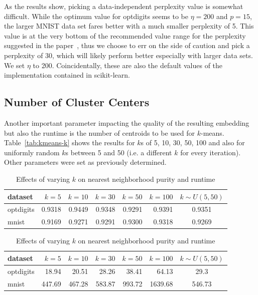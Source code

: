 As the results show, picking a data-independent perplexity value is somewhat difficult.
While the optimum value for optdigits seems to be $\eta = 200$ and $p = 15$, the larger
MNIST data set fares better with a much smaller perplexity of 5. This value is at the
very bottom of the recommended value range for the perplexity suggested in the paper~\cite{tsne},
thus we choose to err on the side of caution and pick a perplexity of 30, which will likely
perform better especially with larger data sets. We set $\eta$ to 200. Coincidentally, these
are also the default values of the implementation contained in scikit-learn.

\subsection{Number of Cluster Centers}

Another important parameter impacting the quality of the resulting embedding
but also the runtime is the number of centroids to be used for $k$-means.
Table~\ref{tab:kmeans-k} shows the results for $k$s of 5, 10, 30, 50, 100 and also
for uniformly random $k$s between 5 and 50 (i.e. a different $k$ for every
iteration). Other parameters were set as previously determined.

\begin{table}[tb]
  \centering
\begin{subtable}{\linewidth}
  \centering
  \begin{tabular}{lrrrrrc}
    \toprule
dataset & $k = 5$ & $k = 10$ & $k = 30$ & $k = 50$ & $k = 100$ & $k \sim U(5, 50)$ \\ \midrule
optdigits & \num{0.9318} & \num{0.9449} & \num{0.9348} & \num{0.9291} & \num{0.9391} & \num{0.9351} \\
mnist & \num{0.9169} & \num{0.9271} & \num{0.9291} & \num{0.9300} & \num{0.9318} & \num{0.9269} \\
    \bottomrule
  \end{tabular}
  \caption{Nearest neighborhood purity}
  \label{tab:kmeans-k}
\end{subtable}
\par\bigskip
\begin{subtable}{\linewidth}
    \centering
  \begin{tabular}{lrrrrrc}
    \toprule
dataset & $k = 5$ & $k = 10$ & $k = 30$ & $k = 50$ & $k = 100$ & $k \sim U(5, 50)$ \\ \midrule
optdigits & \num{18.94} & \num{20.51} & \num{28.26} & \num{38.41} & \num{64.13} & \num{29.3} \\
mnist & \num{447.69} & \num{467.28} & \num{583.87} & \num{993.72} & \num{1639.68} & \num{546.73} \\
    \bottomrule
  \end{tabular}
  \caption{Runtime in seconds}
  \label{tab:k-time}
\end{subtable}
\caption{Effects of varying $k$ on nearest neighborhood purity and runtime}
\end{table}

